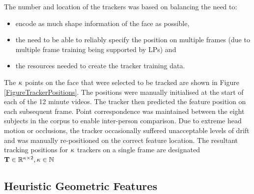 The number and location of the trackers was based on balancing the need to: 
\begin{itemize}
 \item encode as much shape information of the face as possible,
 \item the need to be able to reliably specify the position on multiple frames (due to multiple frame training being supported by \ac{LP}s) and
 \item the resources needed to create the tracker training data.
\end{itemize}

The $\kappa$ points on the face that were selected to be tracked are shown in Figure \ref{FigureTrackerPositions}. The positions were manually initialised at the start of each of the 12 minute videos. The tracker then predicted the feature position on each subsequent frame. Point correspondence was maintained between the eight subjects in the corpus to enable inter-person comparison. Due to extreme head motion or occlusions, the tracker occasionally suffered unacceptable levels of drift and was manually re-positioned on the correct feature location. The resultant tracking positions for $\kappa$ trackers on a single frame are designated $\textbf{T} \in \mathbb{R}^{\kappa \times 2}, \kappa \in \mathbb{N}$


\subsection{Heuristic Geometric Features}
\label{SectionGenerateHeuristic}

